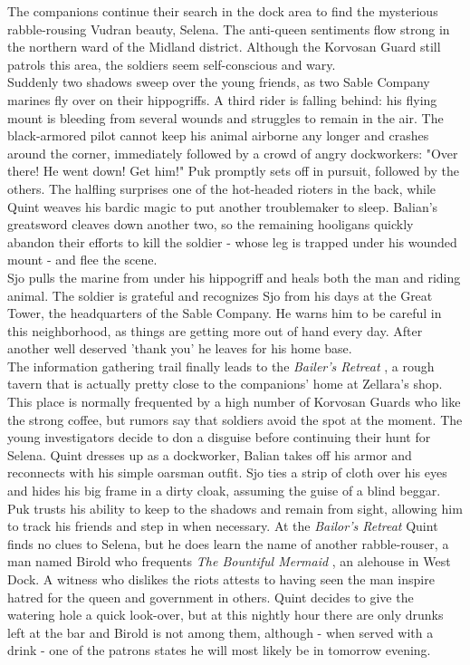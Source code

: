 The companions continue their search in the dock area to find the mysterious rabble-rousing Vudran beauty, Selena. The anti-queen sentiments flow strong in the northern ward of the Midland district. Although the Korvosan Guard still patrols this area, the soldiers seem self-conscious and wary.\\

Suddenly two shadows sweep over the young friends, as two Sable Company marines fly over on their hippogriffs. A third rider is falling behind: his flying mount is bleeding from several wounds and struggles to remain in the air. The black-armored pilot cannot keep his animal airborne any longer and crashes around the corner, immediately followed by a crowd of angry dockworkers: "Over there! He went down! Get him!" Puk promptly sets off in pursuit, followed by the others. The halfling surprises one of the hot-headed rioters in the back, while Quint weaves his bardic magic to put another troublemaker to sleep. Balian's greatsword cleaves down another two, so the remaining hooligans quickly abandon their efforts to kill the soldier - whose leg is trapped under his wounded mount - and flee the scene.\\

Sjo pulls the marine from under his hippogriff and heals both the man and riding animal. The soldier is grateful and recognizes Sjo from his days at the Great Tower, the headquarters of the Sable Company. He warns him to be careful in this neighborhood, as things are getting more out of hand every day. After another well deserved 'thank you' he leaves for his home base.\\

The information gathering trail finally leads to the {\itshape Bailer's Retreat} , a rough tavern that is actually pretty close to the companions' home at Zellara's shop. This place is normally frequented by a high number of Korvosan Guards who like the strong coffee, but rumors say that soldiers avoid the spot at the moment. The young investigators decide to don a disguise before continuing their hunt for Selena. Quint dresses up as a dockworker, Balian takes off his armor and reconnects with his simple oarsman outfit. Sjo ties a strip of cloth over his eyes and hides his big frame in a dirty cloak, assuming the guise of a blind beggar. Puk trusts his ability to keep to the shadows and remain from sight, allowing him to track his friends and step in when necessary. At the {\itshape Bailor's Retreat} Quint finds no clues to Selena, but he does learn the name of another rabble-rouser, a man named Birold who frequents  {\itshape The Bountiful Mermaid} , an alehouse in West Dock. A witness who dislikes the riots attests to having seen the man inspire hatred for the queen and government in others. Quint decides to give the watering hole a quick look-over, but at this nightly hour there are only drunks left at the bar and Birold is not among them, although - when served with a drink - one of the patrons states he will most likely be in tomorrow evening. 